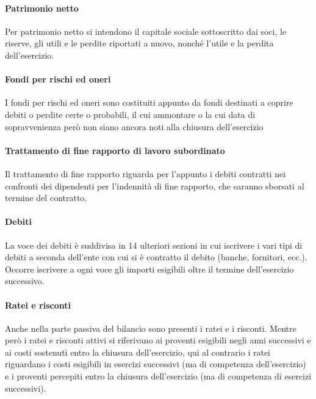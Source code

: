 \paragraph{Patrimonio netto}
Per patrimonio netto si intendono il capitale sociale sottoscritto dai soci, le riserve, gli utili e le perdite riportati a nuovo, nonché l’utile e la perdita dell’esercizio.

\paragraph{Fondi per rischi ed oneri}
I fondi per rischi ed oneri sono costituiti appunto da fondi destinati a coprire debiti o perdite certe o probabili, il cui ammontare o la cui data di sopravvenienza però non siano ancora noti alla chiusura dell’esercizio

\paragraph{Trattamento di fine rapporto di lavoro subordinato}
Il trattamento di fine rapporto riguarda per l’appunto i debiti contratti nei confronti dei dipendenti per l’indennità di fine rapporto, che saranno sborsati al termine del contratto.

\paragraph{Debiti}
La voce dei debiti è suddivisa in 14 ulteriori sezioni in cui iscrivere i vari tipi di debiti a seconda dell’ente con cui si è contratto il debito (banche, fornitori, ecc.). Occorre iscrivere a ogni voce gli importi esigibili oltre il termine dell’esercizio successivo.

\paragraph{Ratei e risconti}
Anche nella parte passiva del bilancio sono presenti i ratei e i risconti. Mentre però i ratei e risconti attivi si riferivano ai proventi esigibili negli anni successivi e ai costi sostenuti entro la chiusura dell’esercizio, qui al contrario i ratei riguardano i costi esigibili in esercizi successivi (ma di competenza dell’esercizio) e i proventi percepiti entro la chiusura dell’esercizio (ma di competenza di esercizi successivi).

